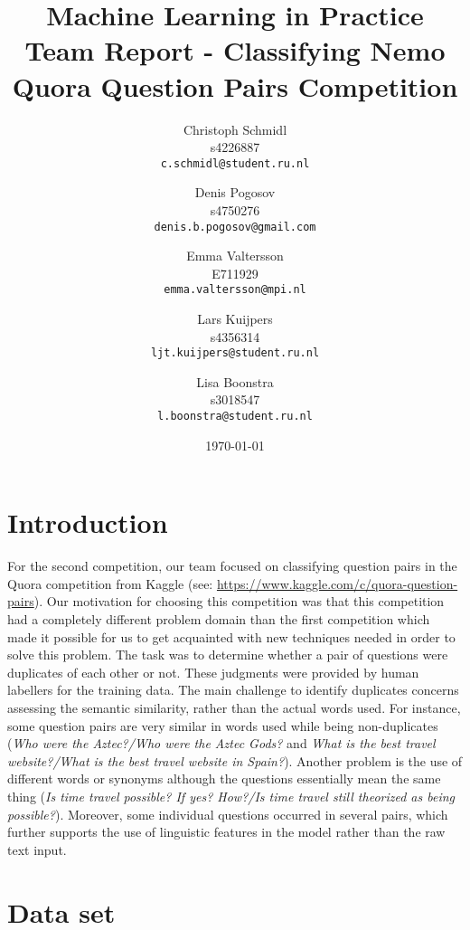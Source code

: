 \documentclass[a4paper]{article}
\title{Machine Learning in Practice\\ \vspace{1em}Team Report - Classifying Nemo\\Quora Question Pairs Competition\vspace{1em}}
\author{
  Christoph Schmidl\\ s4226887\\      \texttt{c.schmidl@student.ru.nl}
  \and
  Denis Pogosov\\ s4750276\\     \texttt{denis.b.pogosov@gmail.com}
  \and
  Emma Valtersson\\	E711929\\	\texttt{emma.valtersson@mpi.nl}
  \and
  Lars Kuijpers\\ s4356314\\ 		\texttt{ljt.kuijpers@student.ru.nl}
  \and
  Lisa Boonstra\\ s3018547\\		\texttt{l.boonstra@student.ru.nl}
}
\date{\today}
\begin{document}
\maketitle


\section{Introduction}


For the second competition, our team focused on classifying question pairs in the Quora competition from Kaggle (see: \url{https://www.kaggle.com/c/quora-question-pairs}). Our motivation for choosing this competition was that this competition had a completely different problem domain than the first competition which made it possible for us to get acquainted with new techniques needed in order to solve this problem. The task was to determine whether a pair of questions were duplicates of each other or not. These judgments were provided by human labellers for the training data. The main challenge to identify duplicates concerns assessing the semantic similarity, rather than the actual words used. For instance, some question pairs are very similar in words used while being non-duplicates (\textit{Who were the Aztec?/Who were the Aztec Gods?} and \textit{What is the best travel website?/What is the best travel website in Spain?}). Another problem is the use of different words or synonyms although the questions essentially mean the same thing (\textit{Is time travel possible? If yes? How?/Is time travel still theorized as being possible?}). Moreover, some individual questions occurred in several pairs, which further supports the use of linguistic features in the model rather than the raw text input.


\section{Data set}
 
\end{document}
